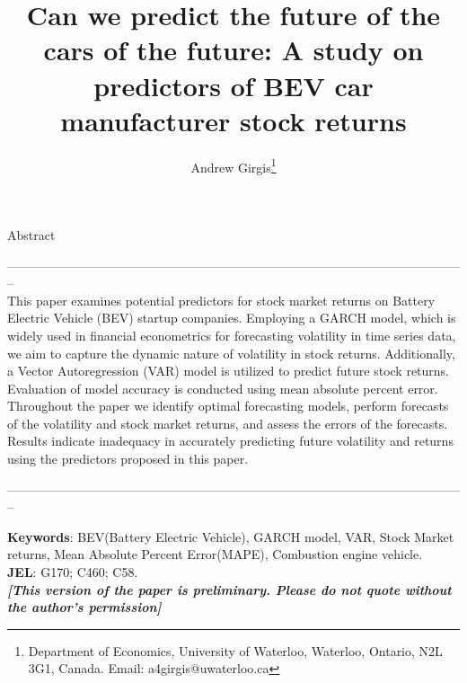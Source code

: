 \documentclass[a4paper,12pt]{article}
\begin{document}
\title{Can we predict the future of the cars of the future: A study on predictors of BEV car manufacturer stock returns}

\author{Andrew Girgis\footnote{Department of Economics, University of Waterloo, Waterloo, Ontario, N2L 3G1,
Canada. Email: a4girgis@uwaterloo.ca}
}
\date{}
\maketitle

\begin{center}
Abstract
\end{center}

--------------------------------------------------------------------------------------------------------------\\


This paper examines potential predictors for stock market returns on Battery Electric Vehicle (BEV) startup companies. Employing a GARCH model, which is widely used in financial econometrics for forecasting volatility in time series data, we aim to capture the dynamic nature of volatility in stock returns. Additionally, a Vector Autoregression (VAR) model is utilized to predict future stock returns. Evaluation of model accuracy is conducted using mean absolute percent error. Throughout the paper we identify optimal forecasting models, perform forecasts of the volatility and stock market returns, and assess the errors of the forecasts. Results indicate inadequacy in accurately predicting future volatility and returns using the predictors proposed in this paper.


--------------------------------------------------------------------------------------------------------------\\


\bigskip



\textbf{Keywords}: BEV(Battery Electric Vehicle), GARCH model, VAR, Stock Market returns, Mean Absolute Percent Error(MAPE), Combustion engine vehicle. \\



\textbf{JEL}:  G170;  C460; C58.\\






\noindent \emph{\textbf{[This version of the paper is preliminary.
Please do not quote without the author's permission]}}
\end{document}
